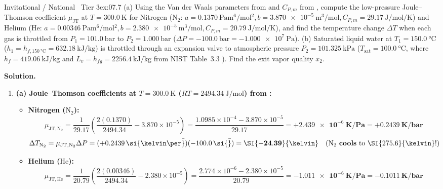 \begin{workedexample}{Invitational / National \textbar\ Tier 3}{ex:07.7}
(a) Using the Van der Waals parameters from  and $C_{P,m}$ from , compute the low-pressure Joule--Thomson coefficient $\mu_{\mathrm{JT}}$ at $T = \SI{300.0}{\kelvin}$ for Nitrogen ($\mathrm{N_2}$: $a = \SI{0.1370}{\pascal\meter^6\per\mole^2}, b = \SI{3.870e-5}{\cubic\meter\per\mole}, C_{P,m} = \SI{29.17}{\joule\per\mole\per\kelvin}$) and Helium ($\mathrm{He}$: $a = \SI{0.00346}{\pascal\meter^6\per\mole^2}, b = \SI{2.380e-5}{\cubic\meter\per\mole}, C_{P,m} = \SI{20.79}{\joule\per\mole\per\kelvin}$), and find the temperature change $\Delta T$ when each gas is throttled from $P_1 = \SI{101.0}{\bar}$ to $P_2 = \SI{1.000}{\bar}$ ($\Delta P = \SI{-100.0}{\bar} = \SI{-1.000e7}{\pascal}$). (b) Saturated liquid water at $T_1 = \SI{150.0}{\celsius}$ ($h_1 = h_{f,\SI{150}{\celsius}} = \SI{632.18}{\kilo\joule\per\kilogram}$) is throttled through an expansion valve to atmospheric pressure $P_2 = \SI{101.325}{\kilo\pascal}$ ($T_{\mathrm{sat}} = \SI{100.0}{\celsius}$, where $h_f = \SI{419.06}{\kilo\joule\per\kilogram}$ and $L_v = h_{fg} = \SI{2256.4}{\kilo\joule\per\kilogram}$ from NIST Table~3.3 ). Find the exit vapor quality $x_2$.
\par\smallskip\noindent
\textbf{Solution.}
\begin{enumerate}
  \item \textbf{(a) Joule--Thomson coefficients at $T = \SI{300.0}{\kelvin}$ ($RT = \SI{2494.34}{\joule\per\mole}$) from :}
  \begin{itemize}
    \item \textbf{Nitrogen ($\mathrm{N_2}$):}
    \[
      \mu_{\mathrm{JT,N_2}} = \frac{1}{29.17}\left(\frac{2(0.1370)}{2494.34} - 3.870\times 10^{-5}\right) = \frac{1.0985\times 10^{-4} - 3.870\times 10^{-5}}{29.17} = \mathbf{+\SI{2.439e-6}{\kelvin\per\pascal}} = \mathbf{+\SI{0.2439}{\kelvin\per\bar}}
    \]
    \[
      \Delta T_{\mathrm{N_2}} = \mu_{\mathrm{JT,N_2}}\Delta P = (+0.2439\,\si{\kelvin\per\bar})(-100.0\,\si{\bar}) = \mathbf{\SI{-24.39}{\kelvin}} \quad (\mathrm{N_2}\text{ \textbf{cools} to } \SI{275.6}{\kelvin}!)
    \]
    \item \textbf{Helium ($\mathrm{He}$):}
    \[
      \mu_{\mathrm{JT,He}} = \frac{1}{20.79}\left(\frac{2(0.00346)}{2494.34} - 2.380\times 10^{-5}\right) = \frac{2.774\times 10^{-6} - 2.380\times 10^{-5}}{20.79} = \mathbf{\SI{-1.011e-6}{\kelvin\per\pascal}} = \mathbf{\SI{-0.1011}{\kelvin\per\bar}}
\]
\end{itemize}
\end{enumerate}
\end{workedexample}
